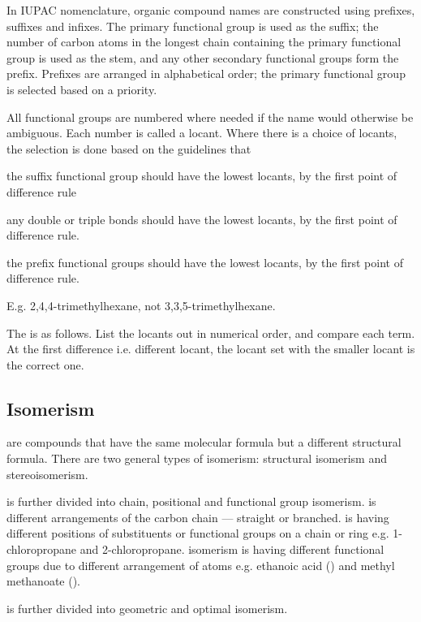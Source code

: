 \documentclass[Chemistry.tex]{subfiles}
\begin{document}
In IUPAC nomenclature, organic compound names are constructed using prefixes, suffixes and infixes. The primary functional group is used as the suffix; the number of carbon atoms in the longest chain containing the primary functional group is used as the stem, and any other secondary functional groups form the prefix. Prefixes are arranged in alphabetical order; the primary functional group is selected based on a priority.

All functional groups are numbered where needed if the name would otherwise be ambiguous. Each number is called a locant. Where there is a choice of locants, the selection is done based on the guidelines that \begin{slinenum}
\item the suffix functional group should have the lowest locants, by the first point of difference rule
\item any double or triple bonds should have the lowest locants, by the first point of difference rule.
\item the prefix functional groups should have the lowest locants, by the first point of difference rule.
\end{slinenum} E.g. 2,4,4-trimethylhexane, not 3,3,5-trimethylhexane.

The  is as follows. List the locants out in numerical order, and compare each term. At the first difference i.e. different locant, the locant set with the smaller locant is the correct one.
\subsection{Isomerism}
 are compounds that have the same molecular formula but a different structural formula. There are two general types of isomerism: structural isomerism and stereoisomerism.

 is further divided into chain, positional and functional group isomerism.  is different arrangements of the carbon chain --- straight or branched.  is having different positions of substituents or functional groups on a chain or ring e.g. 1-chloropropane and 2-chloropropane.  isomerism is having different functional groups due to different arrangement of atoms e.g. ethanoic acid () and methyl methanoate ().

 is further divided into geometric and optimal isomerism.
\end{document}
